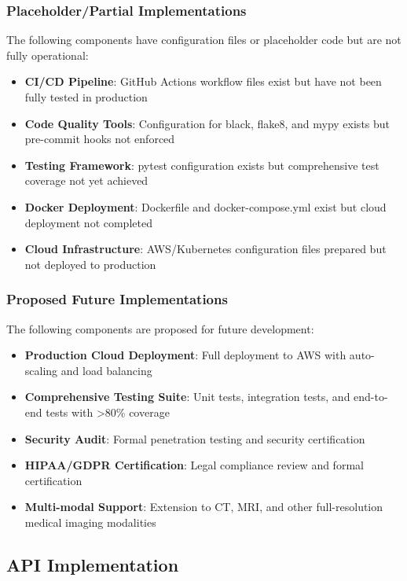 \documentclass[12pt,a4paper]{article}
\begin{document}
\subsubsection{Placeholder/Partial Implementations}

The following components have configuration files or placeholder code but are not fully operational:

\begin{itemize}
    \item \textbf{CI/CD Pipeline}: GitHub Actions workflow files exist but have not been fully tested in production
    \item \textbf{Code Quality Tools}: Configuration for black, flake8, and mypy exists but pre-commit hooks not enforced
    \item \textbf{Testing Framework}: pytest configuration exists but comprehensive test coverage not yet achieved
    \item \textbf{Docker Deployment}: Dockerfile and docker-compose.yml exist but cloud deployment not completed
    \item \textbf{Cloud Infrastructure}: AWS/Kubernetes configuration files prepared but not deployed to production
\end{itemize}

\subsubsection{Proposed Future Implementations}

The following components are proposed for future development:

\begin{itemize}
    \item \textbf{Production Cloud Deployment}: Full deployment to AWS with auto-scaling and load balancing
    \item \textbf{Comprehensive Testing Suite}: Unit tests, integration tests, and end-to-end tests with >80\% coverage
    \item \textbf{Security Audit}: Formal penetration testing and security certification
    \item \textbf{HIPAA/GDPR Certification}: Legal compliance review and formal certification
    \item \textbf{Multi-modal Support}: Extension to CT, MRI, and other full-resolution medical imaging modalities
\end{itemize}

\subsection{API Implementation}
\end{document}
